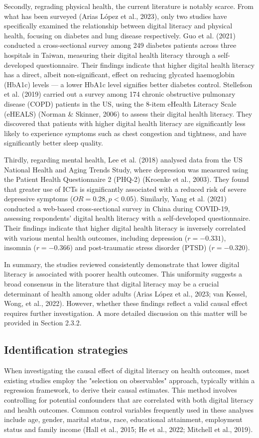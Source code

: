 Secondly, regrading physical health, the current literature is notably scarce. From what has been surveyed (Arias López et al., 2023), only two studies have specifically examined the relationship between digital literacy and physical health, focusing on diabetes and lung disease respectively. Guo et al. (2021) conducted a cross-sectional survey among 249 diabetes patients across three hospitals in Taiwan, measuring their digital health literacy through a self-developed questionnaire. Their findings indicate that higher digital health literacy has a direct, albeit non-significant, effect on reducing glycated haemoglobin (HbA1c) levels — a lower HbA1c level signifies better diabetes control. Stellefson et al. (2019) carried out a survey among 174 chronic obstructive pulmonary disease (COPD) patients in the US, using the 8-item eHealth Literacy Scale (eHEALS) (Norman \& Skinner, 2006) to assess their digital health literacy. They discovered that patients with higher digital health literacy are significantly less likely to experience symptoms such as chest congestion and tightness, and have significantly better sleep quality.

Thirdly, regarding mental health, Lee et al. (2018) analysed data from the US National Health and Aging Trends Study, where depression was measured using the Patient Health Questionnaire 2 (PHQ-2) (Kroenke et al., 2003). They found that greater use of ICTs is significantly associated with a reduced risk of severe depressive symptoms ($OR = 0.28, p < 0.05$). Similarly, Yang et al. (2021) conducted a web-based cross-sectional survey in China during COVID-19, assessing respondents' digital health literacy with a self-developed questionnaire. Their findings indicate that higher digital health literacy is inversely correlated with various mental health outcomes, including depression ($r = -0.331$), insomnia ($r = -0.366$) and post-traumatic stress disorder (PTSD) ($r = -0.320$).

In summary, the studies reviewed consistently demonstrate that lower digital literacy is associated with poorer health outcomes. This uniformity suggests a broad consensus in the literature that digital literacy may be a crucial determinant of health among older adults (Arias López et al., 2023; van Kessel, Wong, et al., 2022). However, whether these findings reflect a valid causal effect requires further investigation. A more detailed discussion on this matter will be provided in Section 2.3.2.

\subsection{Identification strategies}
When investigating the causal effect of digital literacy on health outcomes, most existing studies employ the "selection on observables" approach, typically within a regression framework, to derive their causal estimates. This method involves controlling for potential confounders that are correlated with both digital literacy and health outcomes. Common control variables frequently used in these analyses include age, gender, marital status, race, educational attainment, employment status and family income (Hall et al., 2015; He et al., 2022; Mitchell et al., 2019).

